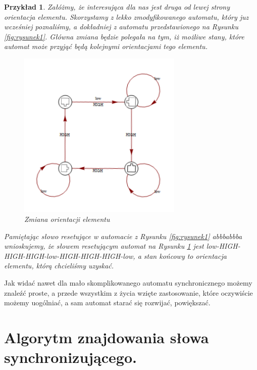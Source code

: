 \documentclass[12pt,a4paper]{article}
\newtheorem{pr}{Przyk{\l}ad}[section]
\begin{document}
\begin{pr}
Za{\l}\'{o}\.{z}my, \.{z}e interesuj\k{a}ca dla nas jest druga od lewej strony orientacja elementu. Skorzystamy z lekko zmodyfikowanego automatu, kt\'{o}ry juz wcze\'{s}niej poznali\'{s}my, a dok{\l}adniej z automatu przedstawionego na Rysunku \ref{fig:rysunek1}. G{\l}\'{o}wna zmiana b\k{e}dzie polega{\l}a na tym, i\.{z} mo\.{z}liwe stany, kt\'{o}re automat mo\.{z}e przyj\k{a}\'{c} b\k{e}d\k{a} kolejnymi orientacjami tego elementu.
\\
\begin{figure}[H]
    \centering
    \includegraphics[width=0.7\textwidth]{rysunek5}
    \caption{Zmiana orientacji elementu}
    \label{fig:rysunek5}
\end{figure}

Pami\k{e}taj\k{a}c s{\l}owo resetuj\k{a}ce w automacie z Rysunku \ref{fig:rysunek1} abbbabbba wnioskujemy, \.{z}e s{\l}owem resetuj\k{a}cym automat na Rysunku \ref{fig:rysunek5} jest low-HIGH-HIGH-HIGH-low-HIGH-HIGH-HIGH-low, a stan ko\'{n}cowy to orientacja elementu, kt\'{o}r\k{a} chcieli\'{s}my uzyska\'{c}.
\end{pr}

Jak wida\'{c} nawet dla ma{\l}o skomplikowanego automatu synchronicznego mo\.{z}emy znale\'{z}\'{c} proste, a przede wszystkim z \.{z}ycia wzi\k{e}te zastosowanie, kt\'{o}re oczywi\'{s}cie mo\.{z}emy uog\'{o}lnia\'{c}, a sam automat stara\'{c} si\k{e} rozwija\'{c}, powi\k{e}ksza\'{c}.


\section{Algorytm znajdowania s{\l}owa synchronizuj\k{a}cego.}
\end{document}
